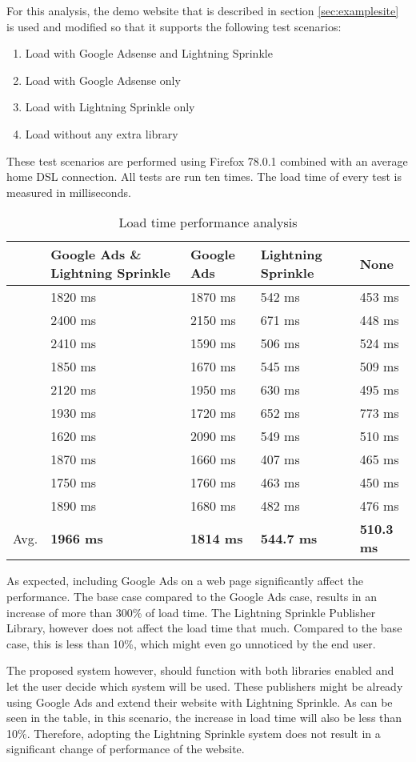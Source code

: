 For this analysis, the demo website that is described in section \ref{sec:examplesite} is used and modified so that it supports the following test scenarios:

\begin{enumerate}
  \item Load with Google Adsense and Lightning Sprinkle
  \item Load with Google Adsense only
  \item Load with Lightning Sprinkle only
  \item Load without any extra library
\end{enumerate}

\newpage
These test scenarios are performed using Firefox 78.0.1 combined with an average home DSL connection. All tests are run ten times. The load time of every test is measured in milliseconds.

\begin{table}[h!]
  \begin{tabular}{lllll}
  & Google Ads \& Lightning Sprinkle & Google Ads & Lightning Sprinkle & None \\
  \hline
  & 1820 ms & 1870 ms & 542 ms & 453 ms \\
  & 2400 ms & 2150 ms & 671 ms & 448 ms  \\
  & 2410 ms & 1590 ms & 506 ms & 524 ms  \\
  & 1850 ms & 1670 ms & 545 ms & 509 ms  \\
  & 2120 ms & 1950 ms & 630 ms & 495 ms  \\
  & 1930 ms & 1720 ms & 652 ms & 773 ms  \\
  & 1620 ms & 2090 ms & 549 ms & 510 ms  \\
  & 1870 ms & 1660 ms & 407 ms & 465 ms  \\
  & 1750 ms & 1760 ms & 463 ms & 450 ms  \\
  & 1890 ms & 1680 ms & 482 ms & 476 ms  \\
  \hline
  Avg. & \textbf{1966 ms} & \textbf{1814 ms} & \textbf{544.7 ms} & \textbf{510.3 ms}
  \end{tabular}
  \caption{Load time performance analysis}
\end{table}

As expected, including Google Ads on a web page significantly affect the performance. The base case compared to the Google Ads case, results in an increase of more than 300\% of load time. The Lightning Sprinkle Publisher Library, however does not affect the load time that much. Compared to the base case, this is less than 10\%, which might even go unnoticed by the end user. 

The proposed system however, should function with both libraries enabled and let the user decide which system will be used. These publishers might be already using Google Ads and extend their website with Lightning Sprinkle. As can be seen in the table, in this scenario, the increase in load time will also be less than 10\%. Therefore, adopting the Lightning Sprinkle system does not result in a significant change of performance of the website.